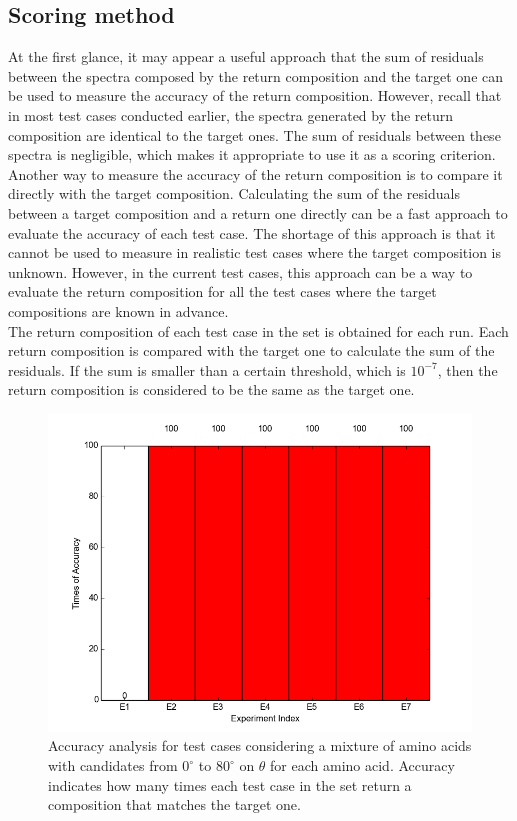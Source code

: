 \subsection{Scoring method}

At the first glance, it may appear a useful approach that the sum of residuals between the spectra composed by the return composition and the target one can be used to measure the accuracy of the return composition. However, recall that in most test cases conducted earlier, the spectra generated by the return composition are identical to the target ones. The sum of residuals between these spectra is negligible, which makes it appropriate to use it as a scoring criterion. \\

Another way to measure the accuracy of the return composition is to compare it directly with the target composition. Calculating the sum of the residuals between a target composition and a return one directly can be a fast approach to evaluate the accuracy of each test case. The shortage of this approach is that it cannot be used to measure in realistic test cases where the target composition is unknown. However, in the current test cases, this approach can be a way to evaluate the return composition for all the test cases where the target compositions are known in advance. \\

The return composition of each test case in the set is obtained for each run. Each return composition is compared with the target one to calculate the sum of the residuals. If the sum is smaller than a certain threshold, which is $10^{-7}$, then the return composition is considered to be the same as the target one. \\

\begin{figure}[!ht]
\centering
\includegraphics[scale=0.7]{Figures/accuracy_pecent_result8_mixture.png}
\caption{Accuracy analysis for test cases considering a mixture of amino acids with candidates from $0^{\circ}$ to $80^{\circ}$ on $\theta$ for each amino acid. Accuracy indicates how many times each test case in the set return a composition that matches the target one.}  \label{fig:5.1}
\end{figure}

